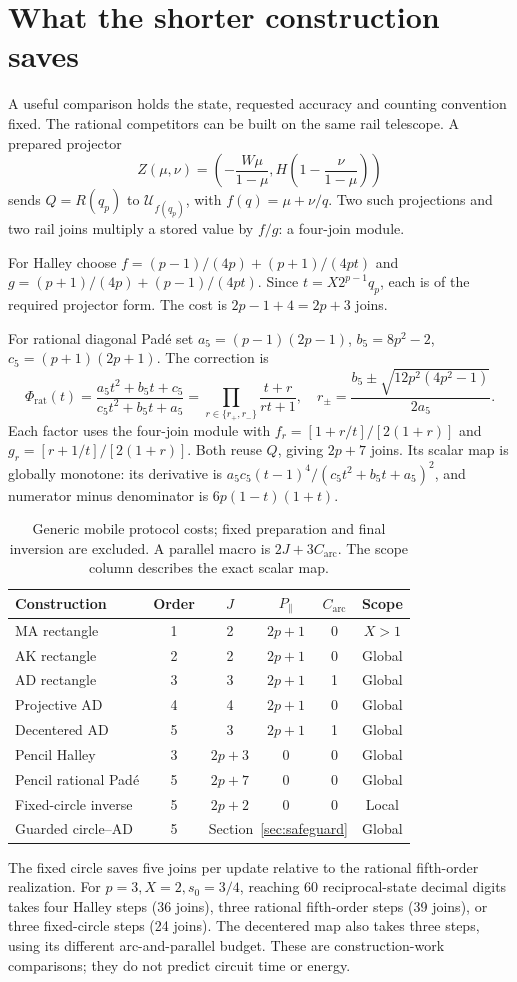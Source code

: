 \documentclass[11pt,a4paper]{article}
\newcommand{\hub}[1]{\mathcal U_{#1}}
\begin{document}
\section{What the shorter construction saves}\label{sec:cost}
A useful comparison holds the state, requested accuracy and counting convention fixed. The rational competitors can be built on the same rail telescope. A prepared projector
\[
 Z(\mu,\nu)=\left(-\frac{W\mu}{1-\mu},H\left(1-\frac{\nu}{1-\mu}\right)\right)
\]
sends $Q=R(q_p)$ to $\hub{f(q_p)}$, with $f(q)=\mu+\nu/q$. Two such projections and two rail joins multiply a stored value by $f/g$: a four-join module.

For Halley choose $f=(p-1)/(4p)+(p+1)/(4pt)$ and $g=(p+1)/(4p)+(p-1)/(4pt)$. Since $t=X2^{p-1}q_p$, each is of the required projector form. The cost is $2p-1+4=2p+3$ joins.

For rational diagonal Pad\'e set $a_5=(p-1)(2p-1)$, $b_5=8p^2-2$, $c_5=(p+1)(2p+1)$. The correction is
\[
 \Phi_{\mathrm{rat}}(t)=\frac{a_5t^2+b_5t+c_5}{c_5t^2+b_5t+a_5}
 =\prod_{r\in\{r_+,r_-\}}\frac{t+r}{rt+1},\quad
 r_\pm=\frac{b_5\pm\sqrt{12p^2(4p^2-1)}}{2a_5}.
\]
Each factor uses the four-join module with $f_r=[1+r/t]/[2(1+r)]$ and $g_r=[r+1/t]/[2(1+r)]$. Both reuse $Q$, giving $2p+7$ joins. Its scalar map is globally monotone: its derivative is $a_5c_5(t-1)^4/(c_5t^2+b_5t+a_5)^2$, and numerator minus denominator is $6p(1-t)(1+t)$.

\begin{table}[H]\centering\small
\caption{Generic mobile protocol costs; fixed preparation and final inversion are excluded. A parallel macro is $2J+3C_{\mathrm{arc}}$. The scope column describes the exact scalar map.}
\begin{tabularx}{\linewidth}{@{}Xccccc@{}}\toprule
Construction & Order & $J$ & $P_{\parallel}$ & $C_{\mathrm{arc}}$ & Scope\\\midrule
MA rectangle & 1 & 2 & $2p+1$ & 0 & $X>1$\\
AK rectangle & 2 & 2 & $2p+1$ & 0 & Global\\
AD rectangle & 3 & 3 & $2p+1$ & 1 & Global\\
Projective AD & 4 & 4 & $2p+1$ & 0 & Global\\
Decentered AD & 5 & 3 & $2p+1$ & 1 & Global\\
Pencil Halley & 3 & $2p+3$ & 0 & 0 & Global\\
Pencil rational Pad\'e & 5 & $2p+7$ & 0 & 0 & Global\\
Fixed-circle inverse & 5 & $2p+2$ & 0 & 0 & Local\\
Guarded circle--AD & 5 & \multicolumn{3}{c}{Section~\ref{sec:safeguard}} & Global\\\bottomrule
\end{tabularx}
\end{table}
The fixed circle saves five joins per update relative to the rational fifth-order realization. For $p=3,X=2,s_0=3/4$, reaching 60 reciprocal-state decimal digits takes four Halley steps (36 joins), three rational fifth-order steps (39 joins), or three fixed-circle steps (24 joins). The decentered map also takes three steps, using its different arc-and-parallel budget. These are construction-work comparisons; they do not predict circuit time or energy.
\end{document}
